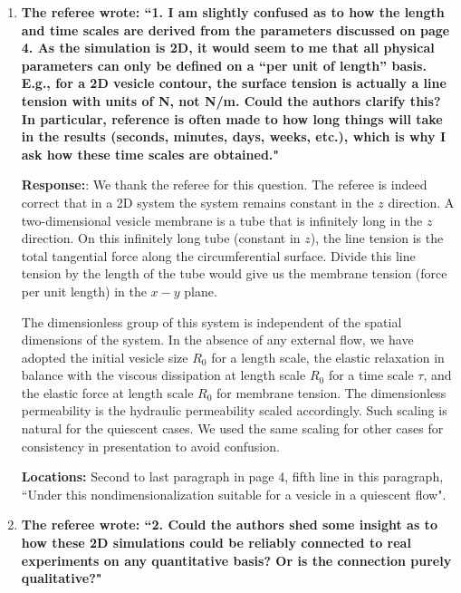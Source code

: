 \documentclass[12pt]{article}
\begin{document}
\begin{enumerate}

\item {\bf The referee wrote: ``1. I am slightly confused as to how the length and time scales are derived from the parameters discussed on page 4. As the simulation is 2D, it would seem to me that all physical parameters can only be defined on a “per unit of length” basis. E.g., for a 2D vesicle contour, the surface tension is actually a line tension with units of N, not N/m. Could the authors clarify this?
In particular, reference is often made to how long things will take in the results (seconds,
minutes, days, weeks, etc.), which is why I ask how these time scales are obtained."}

\noindent
{\bf Response:}: We thank the referee for this question. The referee is indeed correct that in a 2D system the system remains constant in the $z$ direction. A two-dimensional vesicle membrane is a tube that is infinitely long in the $z$ direction.
On this infinitely long tube (constant in $z$), the line tension is the total tangential force along the circumferential surface. Divide this line tension by the length of the tube would give us the membrane tension (force per unit length) in the $x-y$ plane.  
%

The dimensionless group of this system is independent of the spatial dimensions of the system. In the absence of any external flow, we have adopted the initial vesicle size $R_0$ for a length scale,  the elastic relaxation in balance with the viscous dissipation at  length scale $R_0$ for a time scale $\tau$, and the elastic force at length scale $R_0$ for membrane tension. The dimensionless permeability is the hydraulic permeability scaled accordingly. Such scaling is natural for the quiescent cases. We used the same scaling for other cases for consistency in presentation to avoid confusion.

\noindent
{\bf Locations:} Second to last paragraph in page 4, fifth line in this paragraph, ``Under this nondimensionalization suitable for a vesicle in a quiescent flow".


\item {\bf The referee wrote: ``2. Could the authors shed some insight as to how these 2D simulations could be reliably connected to real experiments on any quantitative basis? Or is the connection purely
qualitative?"}


\end{enumerate}
\end{document}
